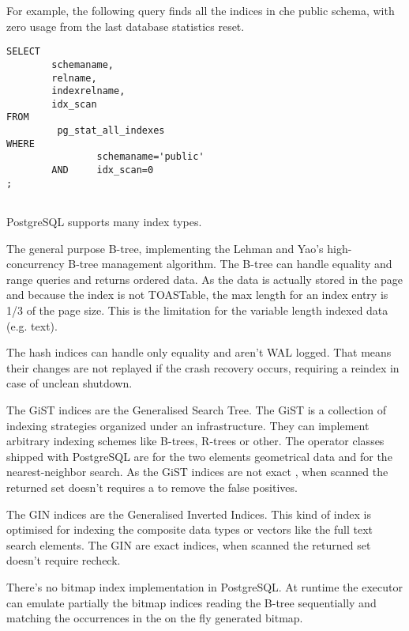 For example, the following query finds all the indices in che public 
schema, with zero usage from the last database statistics reset.

\begin{lstlisting}[style=pgsql]
SELECT
        schemaname,
        relname,
        indexrelname,
        idx_scan
FROM
         pg_stat_all_indexes
WHERE
                schemaname='public'
        AND     idx_scan=0
;


\end{lstlisting}



PostgreSQL supports many index types. 

The general purpose B-tree, implementing the Lehman and 
Yao's high-concurrency B-tree management algorithm. The B-tree can handle 
equality and range queries and returns ordered data. As the data is actually 
stored in the page and because the index is not TOASTable, the max length for an 
index entry is 1/3 of the page size. This is the limitation for the variable 
length indexed data (e.g. text). \newline

The hash indices can handle only equality and aren't WAL 
logged. That means their changes are not replayed if the crash recovery occurs, 
requiring a reindex in case of unclean shutdown.\newline

The GiST indices are the Generalised Search Tree. The GiST 
is a collection of indexing strategies organized under an 
infrastructure. They can implement arbitrary indexing schemes like B-trees, 
R-trees  or other. The operator classes shipped with PostgreSQL are for the two 
elements geometrical data and for the nearest-neighbor search. As the GiST 
indices are not exact , when scanned the returned set doesn't requires a to 
remove the false positives.\newline

The GIN indices  are the Generalised Inverted Indices. This 
kind of index is optimised for indexing the composite data types or vectors 
like the full text search elements. The GIN are exact indices, when scanned the 
returned set doesn't require recheck.

There's no bitmap index implementation in PostgreSQL. 
At runtime the executor can emulate partially the bitmap indices reading the 
B-tree sequentially and matching the occurrences in the on the fly generated 
bitmap. 

